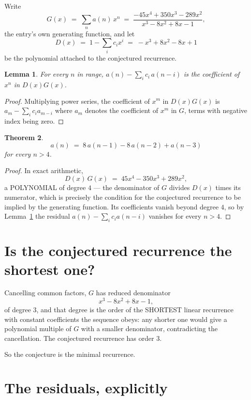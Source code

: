 \documentclass[11pt,a4paper]{article}
\theoremstyle{plain}
\newtheorem{theorem}{Theorem}
\newtheorem{lemma}[theorem]{Lemma}
\theoremstyle{definition}
\begin{document}
Write
\[
G(x)\;=\;\sum_{n}a(n)\,x^{n}\;=\;\frac{- 45 x^{4} + 350 x^{3} - 289 x^{2}}{x^{3} - 8 x^{2} + 8 x - 1},
\]
the entry's own generating function, and let
\[
D(x)\;=\;1-\sum_i c_i x^{i}\;=\;- x^{3} + 8 x^{2} - 8 x + 1
\]
be the polynomial attached to the conjectured recurrence.

\begin{lemma}\label{lem:key}
For every $n$ in range, $a(n)-\sum_i c_i\,a(n-i)$ is the coefficient of $x^{n}$ in
$D(x)G(x)$.
\end{lemma}

\begin{proof}
Multiplying power series, the coefficient of $x^{m}$ in $D(x)G(x)$ is
$a_m-\sum_i c_i a_{m-i}$ where $a_m$ denotes the coefficient of $x^{m}$ in $G$, terms with
negative index being zero.
\end{proof}

\begin{theorem}
\[
a(n)\;=\;8\,a(n-1) - 8\,a(n-2) + a(n-3)
\]
for every $n>4$.
\end{theorem}

\begin{proof}
In exact arithmetic,
\[
D(x)\,G(x)\;=\;45 x^{4} - 350 x^{3} + 289 x^{2},
\]
a POLYNOMIAL of degree $4$ --- the denominator of $G$ divides $D(x)$ times its numerator,
which is precisely the condition for the conjectured recurrence to be implied by the
generating function. Its coefficients vanish beyond degree $4$, so by
Lemma~\ref{lem:key} the residual $a(n)-\sum_ic_ia(n-i)$ vanishes for every
$n>4$.
\end{proof}

\section{Is the conjectured recurrence the shortest one?}

Cancelling common factors, $G$ has reduced denominator
\[
x^{3} - 8 x^{2} + 8 x - 1,
\]
of degree $3$, and that degree is the order of the SHORTEST linear recurrence with
constant coefficients the sequence obeys: any shorter one would give a polynomial multiple of
$G$ with a smaller denominator, contradicting the cancellation. The conjectured recurrence has
order $3$.

So the conjecture is the minimal recurrence.

\section{The residuals, explicitly}
\end{document}
